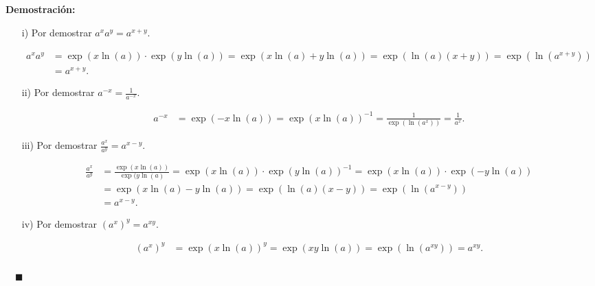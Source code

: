 \documentclass{article}
\numberwithin{equation}{section}
\newcommand{\Col}{\color{ProcessBlue}}
\newenvironment
{proof}
{\par\medskip\noindent\textbf{Demostración:}\rmfamily}
{\Col\hfill$\quad \blacksquare$\vspace{0.5cm}}
\begin{document}
\begin{proof}
    \begin{enumerate}
        \item[i)] Por demostrar $a^xa^y=a^{x+y}$.
        
        \begin{equation*}
        \begin{split}
            a^xa^y & =\exp(x\ln(a))\cdot\exp(y\ln(a))=\exp(x\ln(a)+y\ln(a))=\exp(\ln(a)(x+y)) =\exp(\ln(a^{x+y}))\\
            & =a^{x+y}.
        \end{split}
        \end{equation*}
        
        \item[ii)] Por demostrar  $a^{-x}=\frac{1}{a^{-x}}$.
        
        \begin{equation*}
        \begin{split}
            a^{-x} & =\exp(-x\ln(a))=\exp(x\ln(a))^{-1}=\frac{1}{\exp(\ln(a^x))}=\frac{1}{a^x}.
        \end{split}
        \end{equation*}
        
        \item[iii)] Por demostrar $\frac{a^x}{a^y}=a^{x-y}$.
        
        \begin{equation*}
        \begin{split}
            \frac{a^x}{a^y} & =\frac{\exp(x\ln(a))}{\exp(y\ln(a)}=\exp(x\ln(a))\cdot\exp(y\ln(a))^{-1}=\exp(x\ln(a))\cdot\exp(-y\ln(a)) \\
            & =\exp(x\ln(a)-y\ln(a))=\exp(\ln(a)(x-y))=\exp(\ln(a^{x-y})) \\
            & =a^{x-y}.
        \end{split}
        \end{equation*}
        
        \item[iv)] Por demostrar $\left(a^x\right)^y=a^{xy}$.
        
        \begin{equation*}
        \begin{split}
            \left( a^x \right)^y &=\exp(x\ln(a))^y=\exp(xy\ln(a))=\exp(\ln(a^{xy}))=a^{xy}.  \\
        \end{split}
        \end{equation*}
        
        \end{enumerate}
\end{proof}
\end{document}
